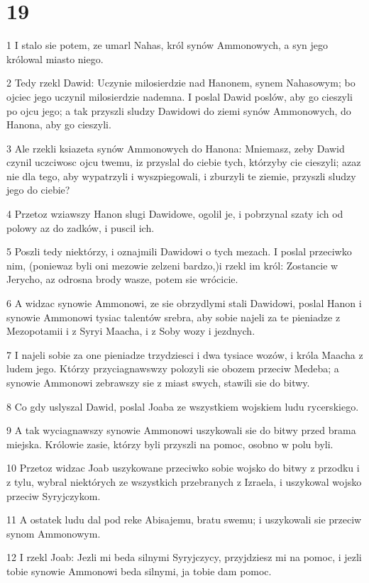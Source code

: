 \chapter{19}

\par 1 I stalo sie potem, ze umarl Nahas, król synów Ammonowych, a syn jego królowal miasto niego.
\par 2 Tedy rzekl Dawid: Uczynie milosierdzie nad Hanonem, synem Nahasowym; bo ojciec jego uczynil milosierdzie nademna. I poslal Dawid poslów, aby go cieszyli po ojcu jego; a tak przyszli sludzy Dawidowi do ziemi synów Ammonowych, do Hanona, aby go cieszyli.
\par 3 Ale rzekli ksiazeta synów Ammonowych do Hanona: Mniemasz, zeby Dawid czynil uczciwosc ojcu twemu, iz przyslal do ciebie tych, którzyby cie cieszyli; azaz nie dla tego, aby wypatrzyli i wyszpiegowali, i zburzyli te ziemie, przyszli sludzy jego do ciebie?
\par 4 Przetoz wziawszy Hanon slugi Dawidowe, ogolil je, i pobrzynal szaty ich od polowy az do zadków, i puscil ich.
\par 5 Poszli tedy niektórzy, i oznajmili Dawidowi o tych mezach. I poslal przeciwko nim, (poniewaz byli oni mezowie zelzeni bardzo,)i rzekl im król: Zostancie w Jerycho, az odrosna brody wasze, potem sie wrócicie.
\par 6 A widzac synowie Ammonowi, ze sie obrzydlymi stali Dawidowi, poslal Hanon i synowie Ammonowi tysiac talentów srebra, aby sobie najeli za te pieniadze z Mezopotamii i z Syryi Maacha, i z Soby wozy i jezdnych.
\par 7 I najeli sobie za one pieniadze trzydziesci i dwa tysiace wozów, i króla Maacha z ludem jego. Którzy przyciagnawswzy polozyli sie obozem przeciw Medeba; a synowie Ammonowi zebrawszy sie z miast swych, stawili sie do bitwy.
\par 8 Co gdy uslyszal Dawid, poslal Joaba ze wszystkiem wojskiem ludu rycerskiego.
\par 9 A tak wyciagnawszy synowie Ammonowi uszykowali sie do bitwy przed brama miejska. Królowie zasie, którzy byli przyszli na pomoc, osobno w polu byli.
\par 10 Przetoz widzac Joab uszykowane przeciwko sobie wojsko do bitwy z przodku i z tylu, wybral niektórych ze wszystkich przebranych z Izraela, i uszykowal wojsko przeciw Syryjczykom.
\par 11 A ostatek ludu dal pod reke Abisajemu, bratu swemu; i uszykowali sie przeciw synom Ammonowym.
\par 12 I rzekl Joab: Jezli mi beda silnymi Syryjczycy, przyjdziesz mi na pomoc, i jezli tobie synowie Ammonowi beda silnymi, ja tobie dam pomoc.
